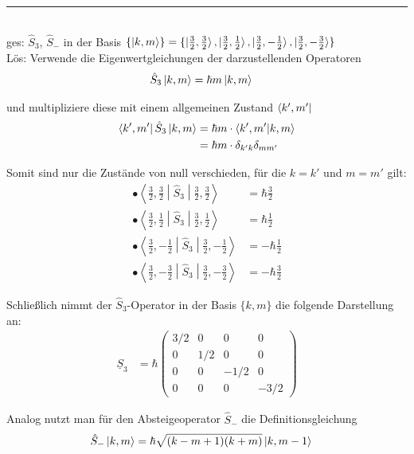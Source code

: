 \documentclass{article}
\begin{document}
{\color{blue}
\hrule
	\\
	ges: $\hat{S}_3$, $\hat{S}_-$ in der Basis $\{ \ket{k, m} \} = \{\ket{\frac{3}{2}, \frac{3}{2}}, \ket{\frac{3}{2}, \frac{1}{2}}, \ket{\frac{3}{2}, -\frac{1}{2}}, \ket{\frac{3}{2}, -\frac{3}{2}}\}$\\
	Lös: Verwende die Eigenwertgleichungen der darzustellenden Operatoren
		\begin{align*}
			\hat{S}_3 \ket{k,m} &= \hbar m \ket{k,m}
		\end{align*}

	und multipliziere diese mit einem allgemeinen Zustand $\bra{ k', m' }$
		\begin{align*}
			\bra{ k', m' } \hat{S}_3 \ket{ k, m } &= \hbar m \cdot \braket{ k', m' | k, m } \\
			&= \hbar m \cdot \delta_{k'k} \delta_{mm'}
		\end{align*}
	
	Somit sind nur die Zustände von null verschieden, für die $k=k'$ und $m=m'$ gilt:	
		\begin{align*}
			\bullet \left\langle\frac{3}{2}, \frac{3}{2} \middle| \hat{S}_3 \middle| \frac{3}{2}, \frac{3}{2} \right\rangle &= \hbar\frac{3}{2} \\
			\bullet \left\langle\frac{3}{2}, \frac{1}{2} \middle| \hat{S}_3 \middle| \frac{3}{2}, \frac{1}{2} \right\rangle &= \hbar \frac{1}{2} \\
			\bullet \left\langle\frac{3}{2}, -\frac{1}{2} \middle| \hat{S}_3 \middle| \frac{3}{2}, -\frac{1}{2} \right\rangle &= -\hbar \frac{1}{2} \\
			\bullet \left\langle\frac{3}{2}, -\frac{3}{2} \middle| \hat{S}_3 \middle| \frac{3}{2}, -\frac{3}{2} \right\rangle &= -\hbar\frac{3}{2}
		\end{align*}
		
		
	Schließlich nimmt der $\hat{S}_3$-Operator in der Basis $\{ k, m \}$ die folgende Darstellung an:
		\begin{align*}
			\underline{S}_3 &= \hbar
			\begin{pmatrix}
				3/2 & 0 & 0 & 0\\
				0 & 1/2 & 0 & 0\\
				0 & 0 & -1/2 & 0\\
				0 & 0 & 0 & -3/2
			\end{pmatrix}
		\end{align*}
	
	
	Analog nutzt man für den Absteigeoperator $\hat{S}_-$ die Definitionsgleichung
		\begin{align*}
			\hat{S}_- \ket{k,m} &= \hbar \sqrt{ (k-m+1)(k+m) } \ket{k,m-1}
		\end{align*}
	
}
\end{document}
